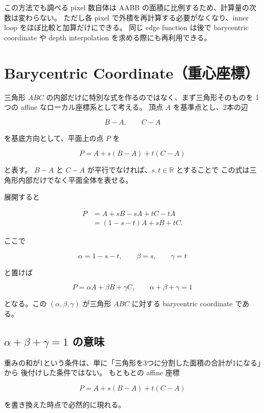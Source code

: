 \documentclass[a4paper,11pt]{ltjsarticle}
\begin{document}
この方法でも調べる pixel 数自体は AABB の面積に比例するため、計算量の次数は変わらない。
ただし各 pixel で外積を再計算する必要がなくなり、inner loop をほぼ比較と加算だけにできる。
同じ edge function は後で barycentric coordinate や depth interpolation を求める際にも再利用できる。

\section{Barycentric Coordinate（重心座標）}

三角形 $ABC$ の内部だけに特別な式を作るのではなく、まず三角形そのものを
1つの affine なローカル座標系として考える。
頂点 $A$ を基準点とし、2本の辺

\[
  B-A,\qquad C-A
\]

を基底方向として、平面上の点 $P$ を

\begin{equation}
  P=A+s(B-A)+t(C-A)
\end{equation}

と表す。
$B-A$ と $C-A$ が平行でなければ、$s,t\in\mathbb{R}$ とすることで
この式は三角形内部だけでなく平面全体を表せる。

展開すると

\begin{align*}
  P
  &=A+sB-sA+tC-tA\\
  &=(1-s-t)A+sB+tC.
\end{align*}

ここで

\[
  \alpha=1-s-t,\qquad
  \beta=s,\qquad
  \gamma=t
\]

と置けば

\begin{equation}
  \boxed{
    P=\alpha A+\beta B+\gamma C,
    \qquad
    \alpha+\beta+\gamma=1
  }
\end{equation}

となる。この $(\alpha,\beta,\gamma)$ が三角形 $ABC$ に対する
barycentric coordinate である。

\subsection{$\alpha+\beta+\gamma=1$ の意味}

重みの和が1という条件は、単に「三角形を3つに分割した面積の合計が1になる」から
後付けした条件ではない。
もともとの affine 座標

\[
  P=A+s(B-A)+t(C-A)
\]

を書き換えた時点で必然的に現れる。
\end{document}
